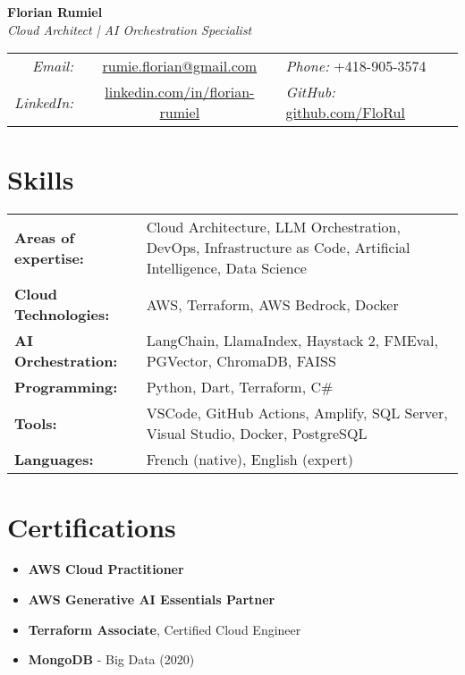 ﻿\documentclass[11pt,letterpaper]{article}
\begin{document}
\begin{center}
  {\LARGE\sffamily\textbf{Florian Rumiel}} \\[0.3em]
  {\large\sffamily\textit{Cloud Architect | AI Orchestration Specialist}} \\[0.5em]
  \begin{tabular}{r c l}
    \textit{Email:} & \href{mailto:rumie.florian@gmail.com}{rumie.florian@gmail.com} & \textit{Phone:} +418-905-3574 \\
    \textit{LinkedIn:} & \href{https://linkedin.com/in/florian-rumiel}{linkedin.com/in/florian-rumiel} & \textit{GitHub:} \href{https://github.com/FloRul}{github.com/FloRul} \\
  \end{tabular}
\end{center}

\section*{Skills}
\begin{tabularx}{\textwidth}{@{}l X@{}}
\textbf{\sffamily Areas of expertise:} & Cloud Architecture, LLM Orchestration, DevOps, Infrastructure as Code, Artificial Intelligence, Data Science \\[0.2em]
\textbf{\sffamily Cloud Technologies:} & AWS, Terraform, AWS Bedrock, Docker \\[0.2em]
\textbf{\sffamily AI Orchestration:} & LangChain, LlamaIndex, Haystack 2, FMEval, PGVector, ChromaDB, FAISS \\[0.2em]
\textbf{\sffamily Programming:} & Python, Dart, Terraform, C\# \\[0.2em]
\textbf{\sffamily Tools:} & VSCode, GitHub Actions, Amplify, SQL Server, Visual Studio, Docker, PostgreSQL \\[0.2em]
\textbf{\sffamily Languages:} & French (native), English (expert) \\
\end{tabularx}

\section*{Certifications}
\begin{itemize}[leftmargin=1.5em]
  \item \textbf{\sffamily AWS Cloud Practitioner}
  \item \textbf{\sffamily AWS Generative AI Essentials Partner}
  \item \textbf{\sffamily Terraform Associate}, Certified Cloud Engineer
  \item \textbf{\sffamily MongoDB} - Big Data (2020)
\end{itemize}
\end{document}
